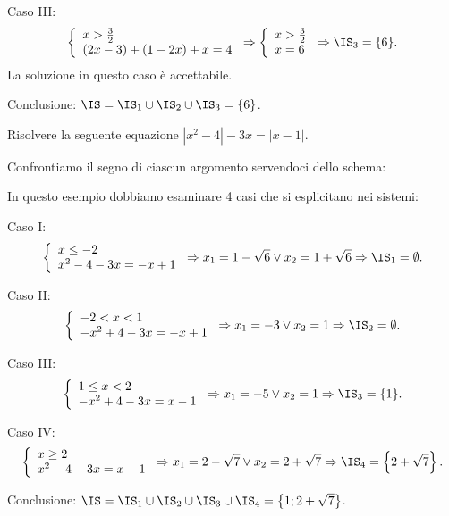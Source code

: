 \begin{exrig}
\begin{esempio}
Caso III: 
\[\left\{\begin{array}{l}x>\frac 3 2\\(2x-3)+(1-2x)+x=4\end{array}\right.\Rightarrow \left\{\begin{array}{l}x>\frac 3 2\\x=6\end{array}\right.\Rightarrow \IS_3=\{6\}.\]
La soluzione in questo caso è accettabile.

Conclusione: $\IS=\IS_1\cup \IS_2\cup \IS_3=\{6\}$.
\end{esempio}

\begin{esempio}
Risolvere la seguente equazione $\left|x^2-4\right|-3x=\left|x-1\right|$.

Confrontiamo il segno di ciascun argomento servendoci dello schema:
\begin{center}

\end{center}
In questo esempio dobbiamo esaminare 4 casi che si esplicitano nei sistemi:
\begin{itemize*}
\item Caso I: 
\[\left\{\begin{array}{l}{x\le -2}\\{x^2-4-3x=-x+1}\end{array}\right.\Rightarrow x_1=1-\sqrt 6\vee x_2=1+\sqrt 6\Rightarrow \IS_1=\emptyset .\]
\item Caso II: 
\[\left\{\begin{array}{l}{-2<x<1}\\{-x^2+4-3x=-x+1}\end{array}\right.\Rightarrow x_1=-3\vee x_2=1\Rightarrow \IS_2=\emptyset .\]
\item Caso III: 
\[\left\{\begin{array}{l}{1\le x<2}\\{-x^2+4-3x=x-1}\end{array}\right.\Rightarrow x_1=-5\vee x_2=1\Rightarrow \IS_3=\{1\}.\]
\item Caso IV: 
\[\left\{\begin{array}{l}{x\ge 2}\\{x^2-4-3x=x-1}\end{array}\right.\Rightarrow x_1=2-\sqrt 7\vee x_2=2+\sqrt 7\Rightarrow \IS_4=\left\{2+\sqrt 7\right\}.\]
\end{itemize*}

Conclusione: $\IS=\IS_1\cup \IS_2\cup \IS_3\cup \IS_4=\left\{1;2+\sqrt 7\right\}$.
\end{esempio}
\end{exrig}

